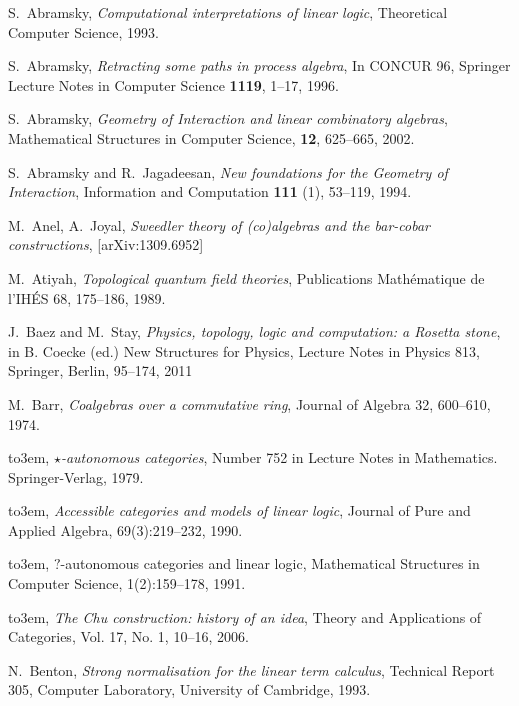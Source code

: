 \documentclass[english,letter paper,12pt,reqno]{article}
\theoremstyle{example}
\numberwithin{equation}{section}
\begin{document}

\providecommand{\bysame}{\leavevmode\hbox to3em{\hrulefill}\thinspace}
\providecommand{\href}[2]{#2}
\begin{thebibliography}{BHLS03}

S.~Abramsky, \textsl{Computational interpretations of linear logic}, Theoretical Computer Science, 1993.

S.~Abramsky, \textsl{Retracting some paths in process algebra}, In CONCUR 96, Springer Lecture Notes in Computer Science \textbf{1119}, 1--17, 1996.

S.~Abramsky, \textsl{Geometry of {I}nteraction and linear combinatory algebras}, Mathematical Structures in Computer Science, \textbf{12}, 625--665, 2002.

S.~Abramsky and R.~Jagadeesan, \textsl{New foundations for the {G}eometry of {I}nteraction}, Information and Computation \textbf{111} (1), 53--119, 1994.

M.~Anel, A.~Joyal, \textsl{Sweedler theory of (co)algebras and the bar-cobar constructions}, \href{http://arxiv.org/abs/1309.6952}{[arXiv:1309.6952]}

M.~Atiyah, \textsl{Topological quantum field theories}, Publications Math\'{e}matique de l'IH\'{E}S 68, 175--186, 1989.

J.~Baez and M.~Stay, \textsl{Physics, topology, logic and computation: a Rosetta stone}, in B. Coecke (ed.) New Structures for Physics, Lecture Notes in Physics 813, Springer, Berlin, 95--174, 2011

M.~Barr, \textsl{Coalgebras over a commutative ring}, Journal of Algebra 32, 600--610, 1974.

\bysame, \textsl{$\star$-autonomous categories}, Number 752 in Lecture Notes in Mathematics. Springer-Verlag, 1979.

\bysame, \textsl{Accessible categories and models of linear logic}, Journal of Pure and Applied Algebra, 69(3):219--232, 1990.

\bysame, {$?$-autonomous categories and linear logic}, Mathematical Structures in Computer Science, 1(2):159--178, 1991.

\bysame, \textsl{The {C}hu construction: history of an idea}, Theory and Applications of Categories, Vol. 17, No. 1, 10--16, 2006.

N.~Benton, \textsl{Strong normalisation for the linear term calculus}, Technical Report 305, Computer Laboratory, University of Cambridge, 1993.


\end{thebibliography}
\end{document}
